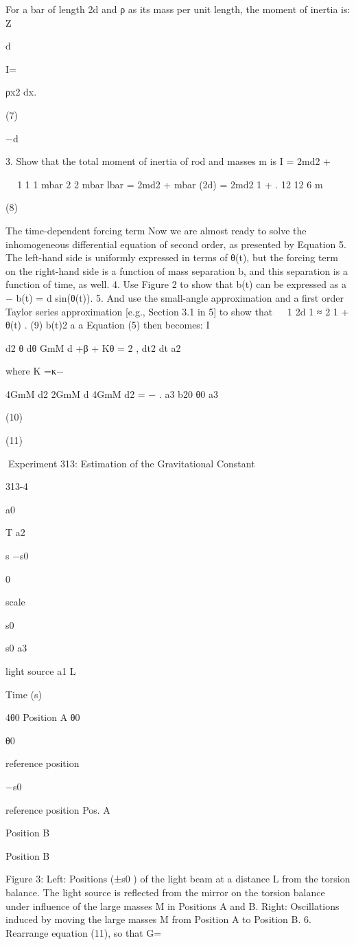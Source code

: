 \documentclass{beamer}
\begin{document}
\begin{frame}
For a bar of length 2d and ρ as its mass per unit length, the moment of inertia is:
Z

d

I=

ρx2 dx.

(7)

−d

3. Show that the total moment of inertia of rod and masses m is
I = 2md2 +



1
1
1 mbar
2
2
mbar lbar
= 2md2 + mbar (2d) = 2md2 1 +
.
12
12
6 m

(8)

The time-dependent forcing term
Now we are almost ready to solve the inhomogeneous differential equation of second order, as presented by
Equation 5. The left-hand side is uniformly expressed in terms of θ(t), but the forcing term on the right-hand
side is a function of mass separation b, and this separation is a function of time, as well.
4. Use Figure 2 to show that b(t) can be expressed as
a − b(t) = d sin(θ(t)).
5. And use the small-angle approximation and a first order Taylor series approximation [e.g., Section 3.1
in 5] to show that


1
2d
1
≈ 2 1 + θ(t) .
(9)
b(t)2
a
a
Equation (5) then becomes:
I

d2 θ
dθ
GmM d
+β
+ Kθ = 2
,
dt2
dt
a2

where
K =κ−

4GmM d2
2GmM d 4GmM d2
=
−
.
a3
b20 θ0
a3

(10)

(11)

Experiment 313: Estimation of the Gravitational Constant

313-4

a0

T
a2

s
−s0

0

scale

s0

s0
a3

light source
a1
L

Time (s)

4θ0
Position A
θ0

θ0

reference position

−s0

reference position
Pos. A

Position B

Position B

Figure 3: Left: Positions (±s0 ) of the light beam at a distance L from the torsion balance. The light source
is reflected from the mirror on the torsion balance under influence of the large masses M in Positions A and
B. Right: Oscillations induced by moving the large masses M from Position A to Position B.
6. Rearrange equation (11), so that
G=


\end{frame}
\end{document}

